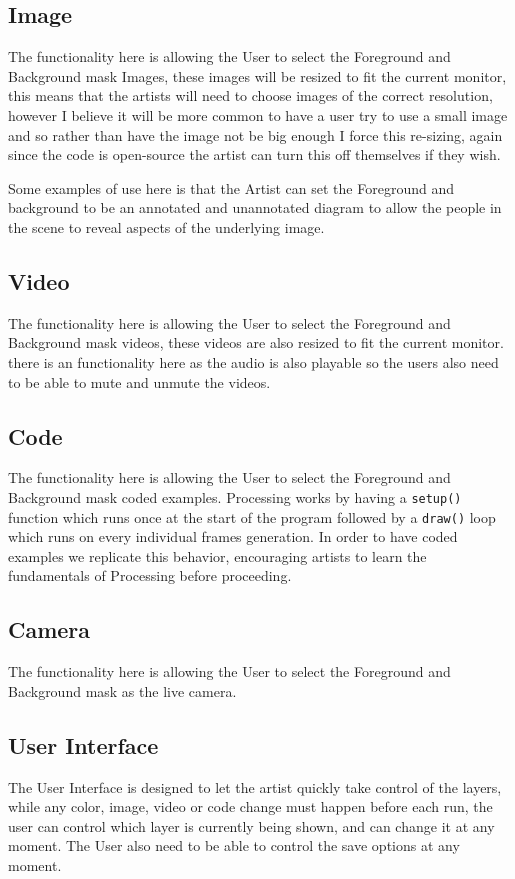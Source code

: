 \documentclass[a4paper]{report}
\begin{document}
\subsection{Image}
The functionality here is allowing the User to select the Foreground and Background mask Images, these images will be resized to fit the current monitor, this means that the artists will need to choose images of the correct resolution, however I believe it will be more common to have a user try to use a small image and so rather than have the image not be big enough I force this re-sizing, again since the code is open-source the artist can turn this off themselves if they wish.

Some examples of use here is that the Artist can set the Foreground and background to be an annotated and unannotated diagram to allow the people in the scene to reveal aspects of the underlying image.

\subsection{Video}
The functionality here is allowing the User to select the Foreground and Background mask videos, these videos are also resized to fit the current monitor. there is an functionality here as the audio is also playable so the users also need to be able to mute and unmute the videos.

\subsection{Code}
The functionality here is allowing the User to select the Foreground and Background mask coded examples. Processing \cite{PROCESSING} works by having a 
\verb|setup()| function which runs once at the start of the program followed by a \verb|draw()| loop which runs on every individual frames generation. In order to have coded examples we replicate this behavior, encouraging artists to learn the fundamentals of Processing before proceeding.

\subsection{Camera}
The functionality here is allowing the User to select the Foreground and Background mask as the live camera.

\subsection{User Interface}
The User Interface is designed to let the artist quickly take control of the layers, while any color, image, video or code change must happen before each run, the user can control which layer is currently being shown, and can change it at any moment. The User also need to be able to control the save options at any moment.
\end{document}
